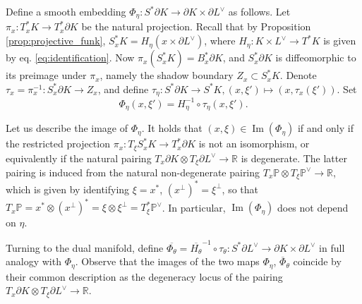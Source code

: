 \documentclass[reqno,10pt]{amsart}
\newcounter{mp}
\DeclareMathOperator{\Image}{Im}
\newcommand{\R}{\mathbb{R}}
\newcommand{\PP}{\mathbb{P}}
\begin{document}
{%

Define a smooth embedding $\Phi_\eta:S^*\partial K\to \partial K\times\partial L^\vee$ as follows. Let $\pi_x: T_x^*K\to T_x^*\partial K$ be the natural projection. Recall that by Proposition \ref{prop:projective_funk}, $S^*_xK=H_\eta(x\times \partial L^\vee)$, where $H_\eta: K\times L^\vee\to T^*K$ is given by eq. \eqref{eq:identification}. Now $\pi_x(S^*_xK)=B_x^*\partial K$, and $S^*_x\partial K$ is diffeomorphic to its preimage under $\pi_x$, namely the shadow boundary $Z_x\subset S_x^* K$. Denote $\tau_x=\pi_x^{-1}:S^*_x\partial K\to Z_x$, and define  $\tau_\eta:S^*\partial K\to S^*K, (x,\xi')\mapsto (x,\tau_x(\xi'))$. Set $$\Phi_\eta(x,\xi')=H_\eta^{-1}\circ\tau_\eta(x, \xi').$$

Let us describe the image of $\Phi_\eta$. It holds that $(x,\xi)\in \Image(\Phi_\eta)$ if and only if the restricted projection $\pi_x:T_\xi S^*_xK\to T_x^*\partial K$ is not an isomorphism, or equivalently if the natural pairing $T_x\partial K\otimes T_\xi\partial L^\vee\to \R$ is degenerate. The latter pairing is induced from the natural non-degenerate pairing $T_x\mathbb P\otimes T_\xi \mathbb P^\vee\to \R$, which is given by identifying $\xi=x^*$, $(x^\perp)^*=\xi^\perp$, so that $T_x \PP=x^*\otimes (x^\perp)^*=\xi\otimes \xi^\perp=T_\xi^*\PP^\vee$. In particular, $\Image(\Phi_\eta)$ does not depend on $\eta$.

Turning to the dual manifold, define $\overline{\Phi_\theta}=\overline{H_\theta}^{-1}\circ\tau_\theta:S^*\partial L^\vee\to \partial K\times\partial L^\vee$ in full analogy with $\Phi_\eta$. Observe that the images of the two maps $\Phi_\eta$, $\overline \Phi_\theta$ coincide by their common description as the degeneracy locus of the pairing  $T_x\partial K\otimes T_\xi\partial L^\vee\to \R$.


}
\end{document}

